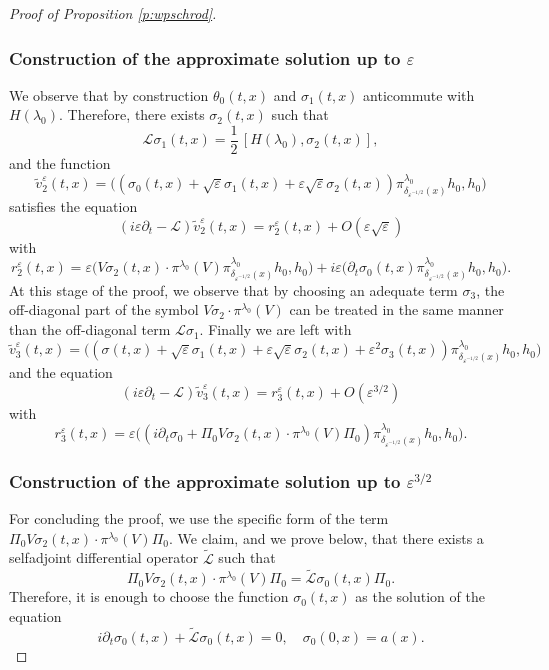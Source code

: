 \documentclass[10pt]{amsart}
\let\mathcal\mathscr
\theoremstyle{plain}
\theoremstyle{definition}
\let\eps\varepsilon
\begin{document}
\begin{proof}[Proof of Proposition \ref{p:wpschrod}]
\subsubsection*{Construction of the approximate solution up to $\eps$}
We observe that by construction $\theta_0(t,x)$ and $\sigma_1(t,x)$ anticommute with $H(\lambda_0)$. Therefore, there exists $\sigma_2(t,x)$ such that
\begin{equation}\label{def:sigma2}
\mathcal{L}\sigma_1(t,x) = \frac 12\, [H(\lambda_0), \sigma_2(t,x)],
\end{equation}
and the function
\[
\widetilde v^\eps_2(t,x)= \bigl((\sigma_0(t,x) +\sqrt\eps \sigma_1(t,x) +\eps\sqrt\eps\sigma_2(t,x))\pi^{\lambda_0}_{\delta_{\eps^{-1/2}}(x)}h_0,h_0\bigr)
\]
satisfies the equation
\[
(i\eps\partial_t-\mathcal{L})\widetilde v^\eps_2(t,x)= r^\eps_2(t,x)+O(\eps\sqrt\eps)
\]
with
\[
r^\eps_2(t,x) = \eps\bigl(V\sigma_2(t,x)\cdot \pi^{\lambda_0}(V)\pi^{\lambda_0}_{\delta_{\eps^{-1/2}}(x)}h_0,h_0\bigr)
+ i\eps \bigl(\partial_t \sigma_0 (t,x)\pi^{\lambda_0}_{\delta_{\eps^{-1/2}}(x)}h_0,h_0\bigr).
\]
At this stage of the proof, we observe that by choosing an adequate term $\sigma_3$, the off-diagonal part of the symbol $V\sigma_2\cdot \pi^{\lambda_0}(V)$ can be treated in the same manner than the off-diagonal term $\mathcal{L}\sigma_1$. Finally we are left with
\[
\widetilde v^\eps_3(t,x)= \bigl((\sigma(t,x) +\sqrt\eps \sigma_1(t,x) +\eps\sqrt\eps \sigma_2(t,x) +\eps^2 \sigma_3(t,x))\pi^{\lambda_0}_{\delta_{\eps^{-1/2}}(x)}h_0,h_0\bigr)
\]
and the equation
\[
(i\eps\partial_t-\mathcal{L})\widetilde v^\eps_3(t,x)= r^\eps_3(t,x) +O(\eps^{3/2})
\]
with
\[
r^\eps_3(t,x)= \eps\bigl((i\partial_t \sigma_0 + \Pi_0 V\sigma_2(t,x)\cdot \pi^{\lambda_0}(V) \Pi_0) \pi^{\lambda_0}_{\delta_{\eps^{-1/2}}(x)}h_0,h_0\bigr).
\]

\subsubsection*{Construction of the approximate solution up to $\eps^{3/2}$}
For concluding the proof, we use the specific form of the term $\Pi_0 V\sigma_2(t,x)\cdot \pi^{\lambda_0}(V) \Pi_0$. We claim, and we prove below, that there exists a selfadjoint differential operator $\widetilde{\mathcal{L}}$ such that
\begin{equation} \label{relation3}
\Pi_0 V\sigma_2(t,x)\cdot \pi^{\lambda_0}(V) \Pi_0=\widetilde{\mathcal{L}}\sigma_0(t,x)\Pi_0.
\end{equation}
Therefore, it is enough to choose the function $\sigma_0(t,x)$ as the solution of the equation
\begin{equation} \label{e:sigma0}
i\partial_t \sigma_0(t,x) + \widetilde{\mathcal{L}}\sigma_0(t,x)=0, \quad \sigma_0(0,x)=a(x).
\end{equation}


\end{proof}
\end{document}
